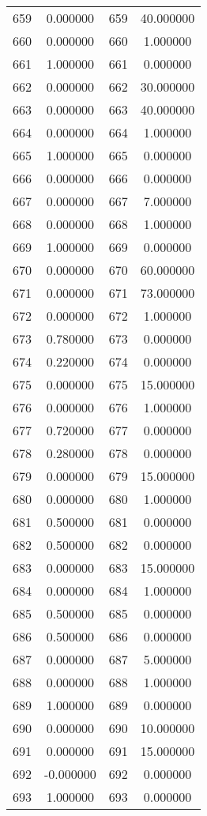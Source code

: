 \documentclass[12pt]{article}
\begin{document}
\begin{longtable}{@{}cccc@{}}
659 & 0.000000 & 659 & 40.000000 \\
660 & 0.000000 & 660 & 1.000000 \\
661 & 1.000000 & 661 & 0.000000 \\
662 & 0.000000 & 662 & 30.000000 \\
663 & 0.000000 & 663 & 40.000000 \\
664 & 0.000000 & 664 & 1.000000 \\
665 & 1.000000 & 665 & 0.000000 \\
666 & 0.000000 & 666 & 0.000000 \\
667 & 0.000000 & 667 & 7.000000 \\
668 & 0.000000 & 668 & 1.000000 \\
669 & 1.000000 & 669 & 0.000000 \\
670 & 0.000000 & 670 & 60.000000 \\
671 & 0.000000 & 671 & 73.000000 \\
672 & 0.000000 & 672 & 1.000000 \\
673 & 0.780000 & 673 & 0.000000 \\
674 & 0.220000 & 674 & 0.000000 \\
675 & 0.000000 & 675 & 15.000000 \\
676 & 0.000000 & 676 & 1.000000 \\
677 & 0.720000 & 677 & 0.000000 \\
678 & 0.280000 & 678 & 0.000000 \\
679 & 0.000000 & 679 & 15.000000 \\
680 & 0.000000 & 680 & 1.000000 \\
681 & 0.500000 & 681 & 0.000000 \\
682 & 0.500000 & 682 & 0.000000 \\
683 & 0.000000 & 683 & 15.000000 \\
684 & 0.000000 & 684 & 1.000000 \\
685 & 0.500000 & 685 & 0.000000 \\
686 & 0.500000 & 686 & 0.000000 \\
687 & 0.000000 & 687 & 5.000000 \\
688 & 0.000000 & 688 & 1.000000 \\
689 & 1.000000 & 689 & 0.000000 \\
690 & 0.000000 & 690 & 10.000000 \\
691 & 0.000000 & 691 & 15.000000 \\
692 & -0.000000 & 692 & 0.000000 \\
693 & 1.000000 & 693 & 0.000000 \\

\end{longtable}
\end{document}
